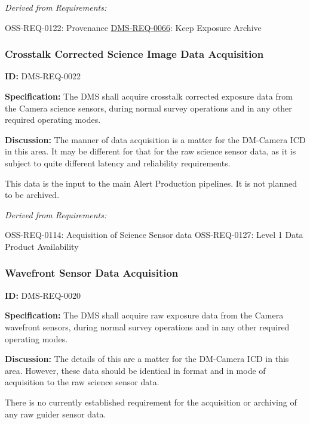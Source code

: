 \documentclass[SE,toc,lsstdraft]{lsstdoc}
\begin{document}
\emph{Derived from Requirements:}

OSS-REQ-0122:
Provenance \newline
\hyperref[DMS-REQ-0066]{DMS-REQ-0066}:
Keep Exposure Archive \newline


\subsubsection{Crosstalk Corrected Science Image Data Acquisition}

\label{DMS-REQ-0022}
\textbf{ID:} DMS-REQ-0022

\textbf{Specification:} The DMS shall acquire crosstalk corrected exposure data from the Camera science sensors, during normal survey operations and in any other required operating modes.

\textbf{Discussion:} The manner of data acquisition is a matter for the DM-Camera ICD in this area.  It may be different for that for the raw science sensor data, as it is subject to quite different latency and reliability requirements.

This data is the input to the main Alert Production pipelines.  It is not planned to be archived.




\emph{Derived from Requirements:}

OSS-REQ-0114:
Acquisition of Science Sensor data \newline
OSS-REQ-0127:
Level 1 Data Product Availability \newline


\subsubsection{Wavefront Sensor Data Acquisition}

\label{DMS-REQ-0020}
\textbf{ID:} DMS-REQ-0020

\textbf{Specification:} The DMS shall acquire raw exposure data from the Camera wavefront sensors, during normal survey operations and in any other required operating modes.

\textbf{Discussion:} The details of this are a matter for the DM-Camera ICD in this area. However, these data should be identical in format and in mode of acquisition to the raw science sensor data.

There is no currently established requirement for the acquisition or archiving of any raw guider sensor data.
\end{document}
